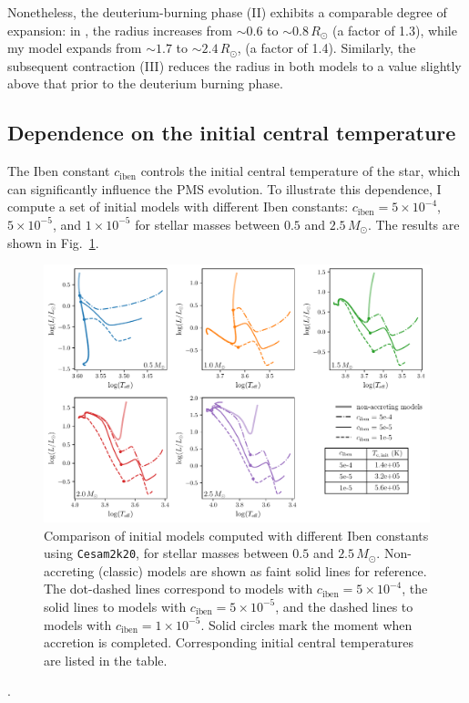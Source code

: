 \documentclass[12pt,a4paper]{article}
\newcommand{\mr}{\mathrm}
\begin{document}
Nonetheless, the deuterium-burning phase (II) exhibits a comparable degree of expansion: in \textcite{KunitomoEtAl2017}, the radius increases from $\sim 0.6$ to $\sim 0.8\,R_\odot$ (a factor of 1.3), while my model expands from $\sim 1.7$ to $\sim 2.4\,R_\odot$, (a factor of 1.4). Similarly, the subsequent contraction (III) reduces the radius in both models to a value slightly above that prior to the deuterium burning phase.

\subsection{Dependence on the initial central temperature}
\label{sec:initial_models}

The Iben constant $c_\mr{iben}$ controls the initial central temperature of the star, which can significantly influence the PMS evolution. To illustrate this dependence, I compute a set of initial models with different Iben constants: $c_\mr{iben} = 5 \times 10^{-4}$, $5 \times 10^{-5}$, and $1 \times 10^{-5}$ for stellar masses between $0.5$ and $2.5\,M_\odot$. The results are shown in Fig.~\ref{fig:comp_iben}.

\begin{figure}[htbp]
  \centering
  \includegraphics[width=\textwidth,keepaspectratio]{ciben_mass_init.pdf}
  \caption{Comparison of initial models computed with different Iben constants using \texttt{Cesam2k20}, for stellar masses between $0.5$ and $2.5\,M_\odot$. Non-accreting (classic) models are shown as faint solid lines for reference. The dot-dashed lines correspond to models with $c_\mr{iben} = 5\times10^{-4}$, the solid lines to models with $c_\mr{iben} = 5\times10^{-5}$, and the dashed lines to models with $c_\mr{iben} = 1\times10^{-5}$. Solid circles mark the moment when accretion is completed. Corresponding initial central temperatures are listed in the table.} 
  \label{fig:comp_iben}
\end{figure}.
\end{document}
